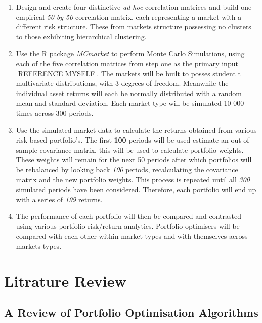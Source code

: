 \documentclass[11pt,preprint, authoryear]{elsarticle}
\numberwithin{equation}{section}
\numberwithin{figure}{section}
\numberwithin{table}{section}
\begin{document}
\begin{enumerate}
\def\labelenumi{\arabic{enumi}.}
\item
  Design and create four distinctive \emph{ad hoc} correlation matrices
  and build one empirical \emph{50 by 50} correlation matrix, each
  representing a market with a different risk structure. These from
  markets structure possessing no clusters to those exhibiting
  hierarchical clustering.
\item
  Use the R package \emph{MCmarket} to perform Monte Carlo Simulations,
  using each of the five correlation matrices from step one as the
  primary input {[}REFERENCE MYSELF{]}. The markets will be built to
  posses student t multivariate distributions, with 3 degrees of
  freedom. Meanwhile the individual asset returns will each be normally
  distributed with a random mean and standard deviation. Each market
  type will be simulated 10 000 times across 300 periods.
\item
  Use the simulated market data to calculate the returns obtained from
  various risk based portfolio's. The first \textbf{100} periods will be
  used estimate an out of sample covariance matrix, this will be used to
  calculate portfolio weights. These weights will remain for the next 50
  periods after which portfolios will be rebalanced by looking back
  \emph{100} periods, recalculating the covariance matrix and the new
  portfolio weights. This process is repeated until all \emph{300}
  simulated periods have been considered. Therefore, each portfolio will
  end up with a series of \emph{199} returns.
\item
  The performance of each portfolio will then be compared and contrasted
  using various portfolio risk/return analytics. Portfolio optimisers
  will be compared with each other within market types and with
  themselves across markets types.
\end{enumerate}

\hypertarget{litrature-review}{%
\section{Litrature Review}\label{litrature-review}}

\hypertarget{a-review-of-portfolio-optimisation-algorithms}{%
\subsection{A Review of Portfolio Optimisation
Algorithms}\label{a-review-of-portfolio-optimisation-algorithms}}
\end{document}
